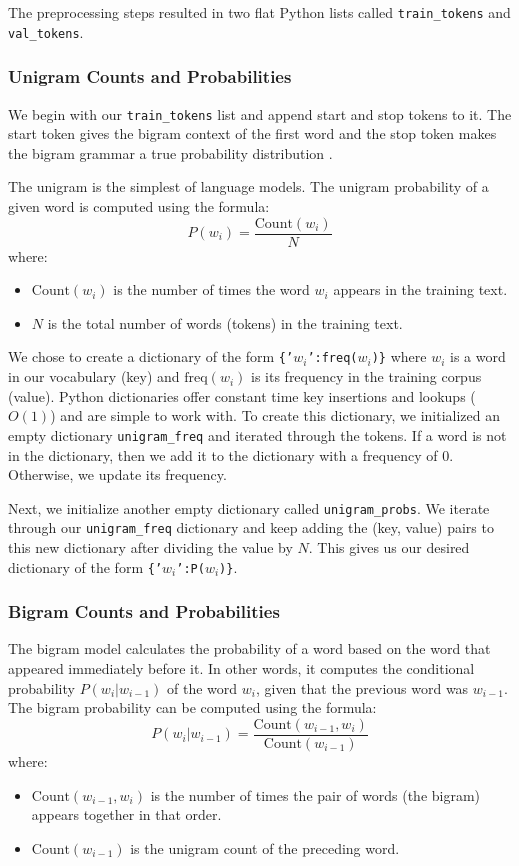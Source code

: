 \documentclass[a4paper]{article}
\begin{document}
The preprocessing steps resulted in two flat Python lists called \texttt{train\_tokens} and \texttt{val\_tokens}.

\subsubsection{Unigram Counts and Probabilities}
We begin with our \texttt{train\_tokens} list and append start and stop tokens to it. The start token gives the bigram context of the first word and the stop token makes the bigram grammar a true probability distribution \cite{jurafsky2021slp}.

The unigram is the simplest of language models. The unigram probability of a given word is computed using the formula:
\[ P(w_i) = \frac{\text{Count}(w_i)}{N} \]
where:
\begin{itemize}
    \item $\text{Count}(w_i)$ is the number of times the word $w_i$ appears in the training text.
    \item $N$ is the total number of words (tokens) in the training text.
\end{itemize}

We chose to create a dictionary of the form \texttt{\{'$w_i$':freq($w_i$)\}} where $w_i$ is a word in our vocabulary (key) and $\text{freq}(w_i)$ is its frequency in the training corpus (value). Python dictionaries offer constant time key insertions and lookups ($O(1)$) and are simple to work with. To create this dictionary, we initialized an empty dictionary \texttt{unigram\_freq} and iterated through the tokens. If a word is not in the dictionary, then we add it to the dictionary with a frequency of 0. Otherwise, we update its frequency.

Next, we initialize another empty dictionary called \texttt{unigram\_probs}. We iterate through our \texttt{unigram\_freq} dictionary and keep adding the (key, value) pairs to this new dictionary after dividing the value by $N$. This gives us our desired dictionary of the form \texttt{\{'$w_i$':P($w_i$)\}}.

\subsubsection{Bigram Counts and Probabilities}
The bigram model calculates the probability of a word based on the word that appeared immediately before it. In other words, it computes the conditional probability $P(w_i | w_{i-1})$ of the word $w_i$, given that the previous word was $w_{i-1}$. The bigram probability can be computed using the formula:
\[ P(w_i | w_{i-1}) = \frac{\text{Count}(w_{i-1}, w_i)}{\text{Count}(w_{i-1})} \]
where:
\begin{itemize}
    \item $\text{Count}(w_{i-1}, w_i)$ is the number of times the pair of words (the bigram) appears together in that order.
    \item $\text{Count}(w_{i-1})$ is the unigram count of the preceding word.
\end{itemize}
\end{document}

